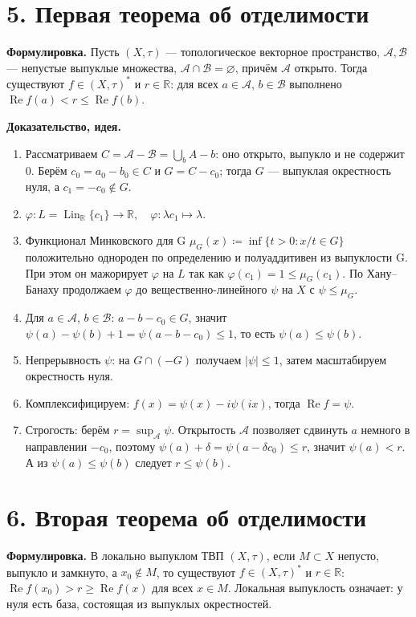 \documentclass[10pt,a4paper]{article}
\newcommand{\X}{X}
\newcommand{\A}{\mathcal A}
\newcommand{\B}{\mathcal B}
\newcommand{\R}{\mathbb R}
\newcommand{\Lin}{\operatorname{Lin}}
\newcommand{\Ree}{\operatorname{Re}}
\begin{document}
	\section*{5. Первая теорема об отделимости}
	\textbf{Формулировка.} Пусть $(\X,\tau)$ --- топологическое векторное пространство, $\A,\B$ --- непустые выпуклые множества, $\A\cap\B=\varnothing$, причём $\A$ открыто. Тогда существуют $f\in(\X,\tau)^\ast$ и $r\in\R$: для всех $a\in\A$, $b\in\B$ выполнено $\Ree f(a)<r\le\Ree f(b)$.

	\textbf{Доказательство, идея.}
	\begin{enumerate}
		\item Рассматриваем $C=\A-\B = \bigcup_b A - b$: оно открыто, выпукло и не содержит $0$. Берём $c_0=a_0-b_0\in C$ и $G=C-c_0$; тогда $G$ --- выпуклая окрестность нуля, а $c_1 = -c_0\notin G$.
		\item  $\varphi: L=\Lin_\R\{c_1\} \to \R, \quad \varphi: \lambda c_1 \mapsto \lambda$.
		\item Функционал Минковского для G $\mu_G(x) \coloneq \inf\{t>0:x/t\in G\}$ положительно однороден по определению и полуаддитивен из выпуклости G. При этом он мажорирует $\varphi$ на $L$ так как $\varphi(c_1) = 1 \leq \mu_G(c_1)$. По Хану--Банаху продолжаем $\varphi$ до вещественно-линейного $\psi$ на $\X$ с $\psi\le\mu_G$.
		\item Для $a\in\A$, $b\in\B$: $a-b-c_0\in G$, значит $\psi(a)-\psi(b)+1=\psi(a-b-c_0)\le1$, то есть $\psi(a)\le\psi(b)$.
		\item Непрерывность $\psi$: на $G\cap(-G)$ получаем $|\psi|\le1$, затем масштабируем окрестность нуля.
		\item Комплексифицируем: $f(x)=\psi(x)-i\psi(ix)$, тогда $\Ree f=\psi$.
		\item Строгость: берём $r=\sup_{\A}\psi$. Открытость $\A$ позволяет сдвинуть $a$ немного в направлении $-c_0$, поэтому $\psi(a)+\delta=\psi(a-\delta c_0)\le r$, значит $\psi(a)<r$. А из $\psi(a)\le\psi(b)$ следует $r\le\psi(b)$.
	\end{enumerate}

	\section*{6. Вторая теорема об отделимости}
	\textbf{Формулировка.} В локально выпуклом ТВП $(\X,\tau)$, если $M\subset\X$ непусто, выпукло и замкнуто, а $x_0\notin M$, то существуют $f\in(\X,\tau)^\ast$ и $r\in\R$: $\Ree f(x_0)>r\ge\Ree f(x)$ для всех $x\in M$. Локальная выпуклость означает: у нуля есть база, состоящая из выпуклых окрестностей.
\end{document}

